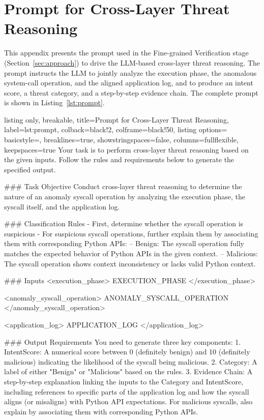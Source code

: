 \appendices
\section{Prompt for Cross-Layer Threat Reasoning}\label{appendix:prompt}

This appendix presents the prompt used in the Fine-grained Verification stage (Section~\ref{sec:approach}) to drive the LLM-based cross-layer threat reasoning. The prompt instructs the LLM to jointly analyze the execution phase, the anomalous system-call operation, and the aligned application log, and to produce an intent score, a threat category, and a step-by-step evidence chain. The complete prompt is shown in Listing~\ref{lst:prompt}.

\begin{tcblisting}{listing only,
  breakable,
  title={Prompt for Cross-Layer Threat Reasoning},
  label={lst:prompt},
  colback=black!2,
  colframe=black!50,
  listing options={
    basicstyle=\small\ttfamily,
    breaklines=true,
    showstringspaces=false,
    columns=fullflexible,
    keepspaces=true
  }
}
Your task is to perform cross-layer threat reasoning based on the given inputs. Follow the rules and requirements below to generate the specified output.

### Task Objective
Conduct cross-layer threat reasoning to determine the nature of an anomaly syscall operation by analyzing the execution phase, the syscall itself, and the application log.

### Classification Rules
- First, determine whether the syscall operation is suspicious
- For suspicious syscall operations, further explain them by associating them with corresponding Python APIs:
-- Benign: The syscall operation fully matches the expected behavior of Python APIs in the given context.
-- Malicious: The syscall operation shows context inconsistency or lacks valid Python context.

### Inputs
<execution_phase>
{{EXECUTION_PHASE}}
</execution_phase>

<anomaly_syscall_operation>
{{ANOMALY_SYSCALL_OPERATION}}
</anomaly_syscall_operation>

<application_log>
{{APPLICATION_LOG}}
</application_log>

### Output Requirements
You need to generate three key components:
1. IntentScore: A numerical score between 0 (definitely benign) and 10 (definitely malicious) indicating the likelihood of the syscall being malicious.
2. Category: A label of either "Benign" or "Malicious" based on the rules.
3. Evidence Chain: A step-by-step explanation linking the inputs to the Category and IntentScore, including references to specific parts of the application log and how the syscall aligns (or misaligns) with Python API expectations. For malicious syscalls, also explain by associating them with corresponding Python APIs.


\end{tcblisting}
